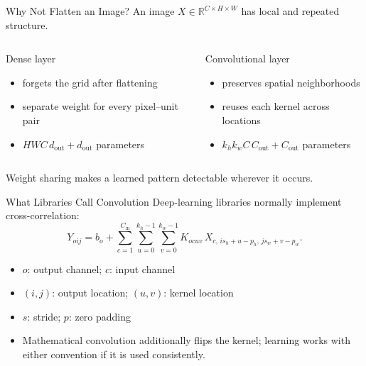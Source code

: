 \documentclass[10pt,aspectratio=169]{ntuabeamer}
\begin{document}

\begin{frame}{Why Not Flatten an Image?}
  An image $X\in\mathbb R^{C\times H\times W}$ has local and repeated structure.
  \begin{columns}[T]
    \begin{block}{Dense layer}
      \begin{itemize}
        \item forgets the grid after flattening
        \item separate weight for every pixel--unit pair
        \item $HWC\,d_{\text{out}}+d_{\text{out}}$ parameters
      \end{itemize}
    \end{block}
    \begin{block}{Convolutional layer}
      \begin{itemize}
        \item preserves spatial neighborhoods
        \item reuses each kernel across locations
        \item $k_hk_wC\,C_{\text{out}}+C_{\text{out}}$ parameters
      \end{itemize}
    \end{block}
  \end{columns}
  \vspace{0.25cm}
  Weight sharing makes a learned pattern detectable wherever it occurs.
\end{frame}

\begin{frame}{What Libraries Call Convolution}
  Deep-learning libraries normally implement cross-correlation:
  \[
    Y_{oij}=b_o+
    \sum_{c=1}^{C_{\mathrm{in}}}
    \sum_{u=0}^{k_h-1}\sum_{v=0}^{k_w-1}
    K_{ocuv}\,X_{c,\,is_h+u-p_h,\,js_w+v-p_w}.
  \]
  \begin{itemize}
    \item $o$: output channel; $c$: input channel
    \item $(i,j)$: output location; $(u,v)$: kernel location
    \item $s$: stride; $p$: zero padding
    \item Mathematical convolution additionally flips the kernel; learning works with either convention if it is used consistently.
  \end{itemize}
\end{frame}
\end{document}
